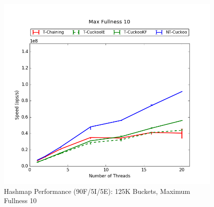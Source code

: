 \begin{figure}[H]
    \centering
	\begin{minipage}{0.5\textwidth}\includegraphics[width=\textwidth]{maps/10HM125K:F90,I5,E5.png} 
    \end{minipage}
	\begin{minipage}{0.4\textwidth}
    
    \end{minipage}
    \caption{Hashmap Performance (90F/5I/5E): 125K Buckets, Maximum Fullness 10}
\end{figure}

